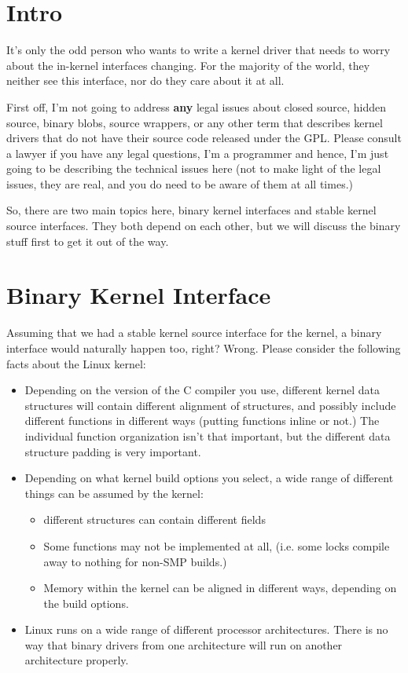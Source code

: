 \documentclass[a4paper,8pt,english]{sphinxmanual}
\begin{document}
\section{Intro}
\label{process/stable-api-nonsense:intro}
It's only the odd person who wants to write a kernel driver that needs
to worry about the in-kernel interfaces changing.  For the majority of
the world, they neither see this interface, nor do they care about it at
all.

First off, I'm not going to address \textbf{any} legal issues about closed
source, hidden source, binary blobs, source wrappers, or any other term
that describes kernel drivers that do not have their source code
released under the GPL.  Please consult a lawyer if you have any legal
questions, I'm a programmer and hence, I'm just going to be describing
the technical issues here (not to make light of the legal issues, they
are real, and you do need to be aware of them at all times.)

So, there are two main topics here, binary kernel interfaces and stable
kernel source interfaces.  They both depend on each other, but we will
discuss the binary stuff first to get it out of the way.


\section{Binary Kernel Interface}
\label{process/stable-api-nonsense:binary-kernel-interface}
Assuming that we had a stable kernel source interface for the kernel, a
binary interface would naturally happen too, right?  Wrong.  Please
consider the following facts about the Linux kernel:
\begin{itemize}
\item {} 
Depending on the version of the C compiler you use, different kernel
data structures will contain different alignment of structures, and
possibly include different functions in different ways (putting
functions inline or not.)  The individual function organization
isn't that important, but the different data structure padding is
very important.

\item {} 
Depending on what kernel build options you select, a wide range of
different things can be assumed by the kernel:
\begin{itemize}
\item {} 
different structures can contain different fields

\item {} 
Some functions may not be implemented at all, (i.e. some locks
compile away to nothing for non-SMP builds.)

\item {} 
Memory within the kernel can be aligned in different ways,
depending on the build options.

\end{itemize}

\item {} 
Linux runs on a wide range of different processor architectures.
There is no way that binary drivers from one architecture will run
on another architecture properly.

\end{itemize}
\end{document}
